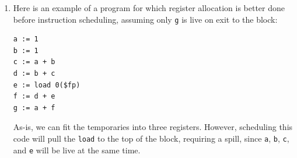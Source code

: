 \documentclass{article}
\begin{document}
\begin{enumerate}
\begin{enumerate}
\item Here is an example of a program for which register allocation
is better done before instruction scheduling, assuming only \texttt{g}
is live on exit to the block:
\begin{verbatim}
a := 1
b := 1
c := a + b
d := b + c
e := load 0($fp)
f := d + e
g := a + f
\end{verbatim}
As-is, we can fit the temporaries into three registers.  However,
scheduling this code will pull the \texttt{load} to the top of the
block, requiring a spill, since \texttt{a}, \texttt{b}, \texttt{c},
and \texttt{e} will be live at the same time.

\end{enumerate}
\end{enumerate}
\end{document}
